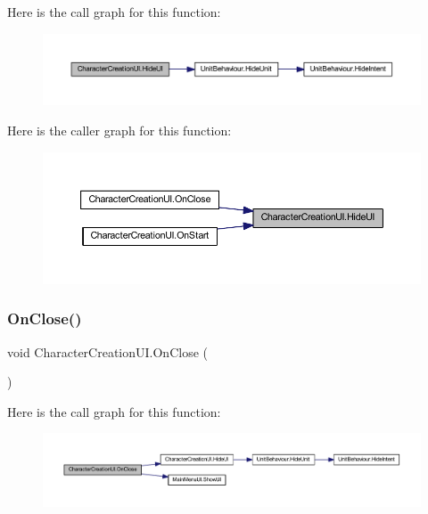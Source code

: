 Here is the call graph for this function\+:\nopagebreak
\begin{figure}[H]
\begin{center}
\leavevmode
\includegraphics[width=350pt]{class_character_creation_u_i_a1724d7136e40f03376f720ec0ecb2d83_cgraph}
\end{center}
\end{figure}
Here is the caller graph for this function\+:\nopagebreak
\begin{figure}[H]
\begin{center}
\leavevmode
\includegraphics[width=350pt]{class_character_creation_u_i_a1724d7136e40f03376f720ec0ecb2d83_icgraph}
\end{center}
\end{figure}
\mbox{\label{class_character_creation_u_i_a3a3792f0c251839acb08848c3bf0e6e0}} 
\subsubsection{\texorpdfstring{OnClose()}{OnClose()}}
{\footnotesize\ttfamily void Character\+Creation\+U\+I.\+On\+Close (\begin{DoxyParamCaption}{ }\end{DoxyParamCaption})}

Here is the call graph for this function\+:\nopagebreak
\begin{figure}[H]
\begin{center}
\leavevmode
\includegraphics[width=350pt]{class_character_creation_u_i_a3a3792f0c251839acb08848c3bf0e6e0_cgraph}
\end{center}
\end{figure}
\mbox{\label{class_character_creation_u_i_a07db6ab68cff5c8d43ed3809e45efe0c}} 
